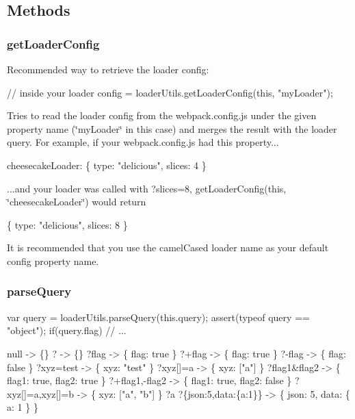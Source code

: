 \subsection*{Methods}

\subsubsection*{{\ttfamily get\+Loader\+Config}}

Recommended way to retrieve the loader config\+:


\begin{DoxyCode}
// inside your loader
config = loaderUtils.getLoaderConfig(this, "myLoader");
\end{DoxyCode}


Tries to read the loader config from the {\ttfamily webpack.\+config.\+js} under the given property name ({\ttfamily \char`\"{}my\+Loader\char`\"{}} in this case) and merges the result with the loader query. For example, if your {\ttfamily webpack.\+config.\+js} had this property...


\begin{DoxyCode}
cheesecakeLoader: \{
    type: "delicious",
    slices: 4
\}
\end{DoxyCode}


...and your loader was called with {\ttfamily ?slices=8}, {\ttfamily get\+Loader\+Config(this, \char`\"{}cheesecake\+Loader\char`\"{})} would return


\begin{DoxyCode}
\{
    type: "delicious",
    slices: 8
\}
\end{DoxyCode}


It is recommended that you use the camel\+Cased loader name as your default config property name.

\subsubsection*{{\ttfamily parse\+Query}}


\begin{DoxyCode}
var query = loaderUtils.parseQuery(this.query);
assert(typeof query == "object");
if(query.flag)
    // ...
\end{DoxyCode}



\begin{DoxyCode}
null                   -> \{\}
?                      -> \{\}
?flag                  -> \{ flag: true \}
?+flag                 -> \{ flag: true \}
?-flag                 -> \{ flag: false \}
?xyz=test              -> \{ xyz: "test" \}
?xyz[]=a               -> \{ xyz: ["a"] \}
?flag1&flag2           -> \{ flag1: true, flag2: true \}
?+flag1,-flag2         -> \{ flag1: true, flag2: false \}
?xyz[]=a,xyz[]=b       -> \{ xyz: ["a", "b"] \}
?a%
?\{json:5,data:\{a:1\}\}   -> \{ json: 5, data: \{ a: 1 \} \}
\end{DoxyCode}



